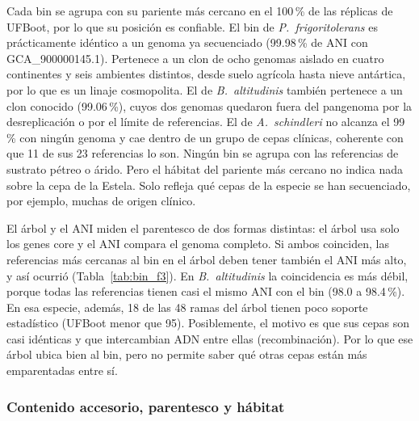Cada bin se agrupa con su pariente más cercano en el 100\,\% de las réplicas de
UFBoot, por lo que su posición es confiable. El bin de \textit{P.~frigoritolerans}
es prácticamente idéntico a un genoma ya secuenciado (99.98\,\% de ANI con
GCA\_900000145.1). Pertenece a un clon de ocho genomas aislado en cuatro
continentes y seis ambientes distintos, desde suelo agrícola hasta nieve
antártica, por lo que es un linaje cosmopolita. El de \textit{B.~altitudinis}
también pertenece a un clon conocido (99.06\,\%), cuyos dos genomas quedaron
fuera del pangenoma por la desreplicación o por el límite de referencias. El de
\textit{A.~schindleri} no alcanza el 99\,\% con ningún genoma y cae dentro de un
grupo de cepas clínicas, coherente con que 11 de sus 23 referencias lo son.
Ningún bin se agrupa con las referencias de sustrato pétreo o árido. Pero el hábitat del pariente más cercano no indica nada sobre la cepa de la
Estela. Solo refleja qué cepas de la especie se han secuenciado, por ejemplo,
muchas de origen clínico.

El árbol y el ANI miden el parentesco de dos formas distintas: el árbol usa
solo los genes core y el ANI compara el genoma completo. Si ambos coinciden,
las referencias más cercanas al bin en el árbol deben tener también el ANI más
alto, y así ocurrió (Tabla~\ref{tab:bin_f3}). En \textit{B.~altitudinis} la
coincidencia es más débil, porque todas las referencias tienen casi el mismo
ANI con el bin (98.0 a 98.4\,\%). En esa especie, además, 18 de las 48 ramas
del árbol tienen poco soporte estadístico (UFBoot menor que 95). Posiblemente, el motivo es
que sus cepas son casi idénticas y que intercambian ADN entre ellas
(recombinación). Por lo que ese árbol ubica bien al bin, pero no permite saber
qué otras cepas están más emparentadas entre sí.

\subsubsection{Contenido accesorio, parentesco y hábitat}
\label{subsubsec:res_accesorio}

